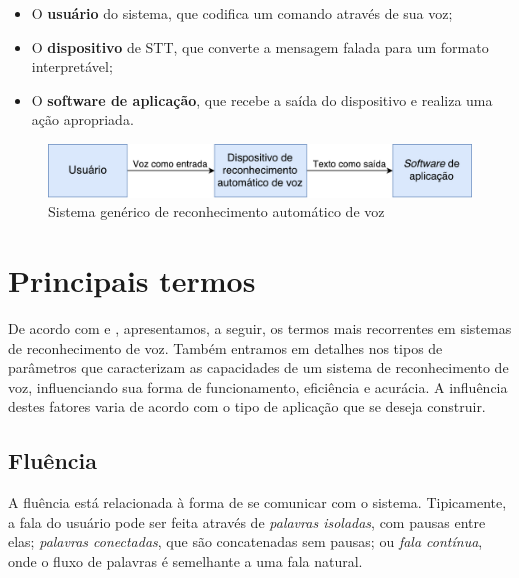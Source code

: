\begin{itemize}
\item O \textbf{usuário} do sistema, que codifica um comando através de sua voz;

\item O \textbf{dispositivo} de STT, que converte a mensagem falada para um formato interpretável;

\item O \textbf{software de aplicação}, que recebe a saída do dispositivo e realiza uma ação apropriada.
\end{itemize}

\begin{figure}[H]
  \centering
  \includegraphics[width=.9\textwidth]{image/generic-stt.pdf}
  \caption{Sistema genérico de reconhecimento automático de voz \citep{sttComponentsParameters}}
  \label{generic-stt}
\end{figure}


\section{Principais termos}
\label{sttMainTerms}

De acordo com \citep{sttComponentsParameters} e \citep{sttBasics}, apresentamos, a seguir, os termos mais recorrentes em sistemas de reconhecimento de voz. Também entramos em detalhes nos tipos de parâmetros que caracterizam as capacidades de um sistema de reconhecimento de voz, influenciando sua forma de funcionamento, eficiência e acurácia. A influência destes fatores varia de acordo com o tipo de aplicação que se deseja construir.


\subsection{Fluência}

A fluência está relacionada à forma de se comunicar com o sistema. Tipicamente, a fala do usuário pode ser feita através de \emph{palavras isoladas}, com pausas entre elas; \emph{palavras conectadas}, que são concatenadas sem pausas; ou \emph{fala contínua}, onde o fluxo de palavras é semelhante a uma fala natural.

